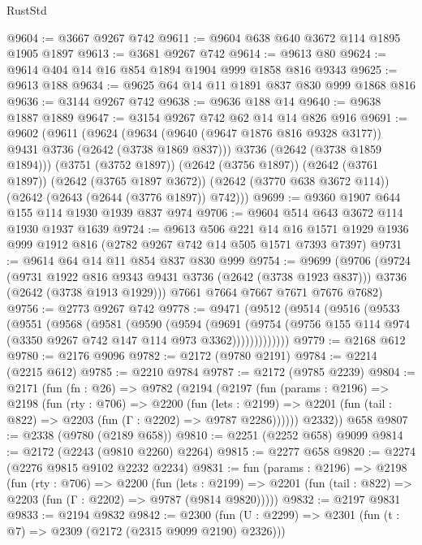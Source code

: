 \begin{lexlean}{RustStd}
\begin{coremodule}
@9604 := @3667 @9267 @742
@9611 := @9604 @638 @640 @3672 @114 @1895 @1905 @1897
@9613 := @3681 @9267 @742
@9614 := @9613 @80
@9624 := @9614 @404 @14 @16 @854 @1894 @1904 @999 @1858 @816 @9343
@9625 := @9613 @188
@9634 := @9625 @64 @14 @11 @1891 @837 @830 @999 @1868 @816
@9636 := @3144 @9267 @742
@9638 := @9636 @188 @14
@9640 := @9638 @1887 @1889
@9647 := @3154 @9267 @742 @62 @14 @14 @826 @916
@9691 := @9602
    (@9611
      (@9624
        (@9634 (@9640 (@9647 @1876 @816 @9328 @3177)) @9431 @3736 (@2642 (@3738 @1869 @837)))
        @3736
        (@2642 (@3738 @1859 @1894)))
      (@3751 (@3752 @1897))
      (@2642 (@3756 @1897))
      (@2642 (@3761 @1897))
      (@2642 (@3765 @1897 @3672))
      (@2642 (@3770 @638 @3672 @114))
      (@2642 (@2643 (@2644 (@3776 @1897)) @742)))
@9699 := @9360 @1907 @644 @155 @114 @1930 @1939 @837 @974
@9706 := @9604 @514 @643 @3672 @114 @1930 @1937 @1639
@9724 := @9613
    @506
    @221
    @14
    @16
    @1571
    @1929
    @1936
    @999
    @1912
    @816
    (@2782 @9267 @742 @14 @505 @1571 @7393 @7397)
@9731 := @9614 @64 @14 @11 @854 @837 @830 @999
@9754 := @9699
    (@9706
      (@9724
        (@9731 @1922 @816 @9343 @9431 @3736 (@2642 (@3738 @1923 @837)))
        @3736
        (@2642 (@3738 @1913 @1929)))
      @7661
      @7664
      @7667
      @7671
      @7676
      @7682)
@9756 := @2773 @9267 @742
@9778 := @9471
    (@9512
      (@9514
        (@9516
          (@9533
            (@9551
              (@9568
                (@9581
                  (@9590
                    (@9594
                      (@9691
                        (@9754
                          (@9756 @155 @114 @974 (@3350 @9267 @742 @147 @114 @973 @3362)))))))))))))
@9779 := @2168 @612
@9780 := @2176 @9096
@9782 := @2172 (@9780 @2191)
@9784 := @2214 (@2215 @612)
@9785 := @2210 @9784
@9787 := @2172 (@9785 @2239)
@9804 := @2171
    (fun (fn : @26) =>
    @9782
      (@2194
        (@2197
          (fun (params : @2196) =>
          @2198
            (fun (rty : @706) =>
            @2200
              (fun (lets : @2199) =>
              @2201 (fun (tail : @822) => @2203 (fun (Γ : @2202) => @9787 @2286))))))
        @2332))
    @658
@9807 := @2338 (@9780 (@2189 @658))
@9810 := @2251 (@2252 @658) @9099
@9814 := @2172 (@2243 (@9810 @2260) @2264)
@9815 := @2277 @658
@9820 := @2274 (@2276 @9815 @9102 @2232 @2234)
@9831 := fun (params : @2196) =>
  @2198
    (fun (rty : @706) =>
    @2200
      (fun (lets : @2199) =>
      @2201 (fun (tail : @822) => @2203 (fun (Γ : @2202) => @9787 (@9814 @9820)))))
@9832 := @2197 @9831
@9833 := @2194 @9832
@9842 := @2300 (fun (U : @2299) => @2301 (fun (t : @7) => @2309 (@2172 (@2315 @9099 @2190) @2326)))

\end{coremodule}
\end{lexlean}
